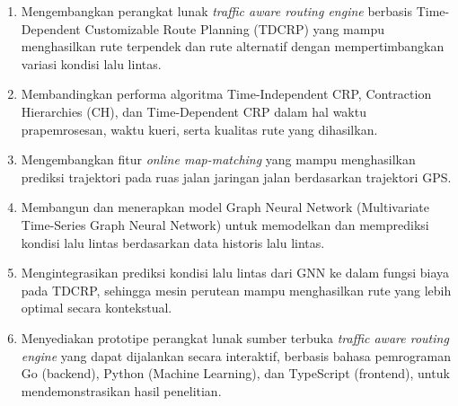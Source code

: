 \begin{enumerate}
    \item Mengembangkan  perangkat lunak \textit{traffic aware routing engine} berbasis Time-Dependent Customizable Route Planning (TDCRP) yang mampu menghasilkan rute terpendek dan rute alternatif dengan mempertimbangkan variasi kondisi lalu lintas.
    \item Membandingkan performa algoritma Time-Independent CRP, Contraction Hierarchies (CH), dan Time-Dependent CRP dalam hal waktu prapemrosesan, waktu kueri, serta kualitas rute yang dihasilkan.
    \item Mengembangkan fitur \textit{online map-matching} yang mampu menghasilkan      prediksi trajektori pada ruas jalan jaringan jalan berdasarkan trajektori GPS.
    \item  Membangun dan menerapkan model Graph Neural Network (Multivariate Time-Series Graph Neural Network) untuk memodelkan dan memprediksi kondisi lalu lintas berdasarkan data historis lalu lintas.
    \item Mengintegrasikan prediksi kondisi lalu lintas dari GNN ke dalam fungsi biaya pada TDCRP, sehingga mesin perutean mampu menghasilkan rute yang lebih optimal secara kontekstual.  
    
    \item Menyediakan prototipe perangkat lunak sumber terbuka \textit{traffic aware routing engine} yang dapat dijalankan secara interaktif, berbasis bahasa pemrograman Go (backend), Python (Machine Learning), dan TypeScript (frontend), untuk mendemonstrasikan hasil penelitian.
\end{enumerate}